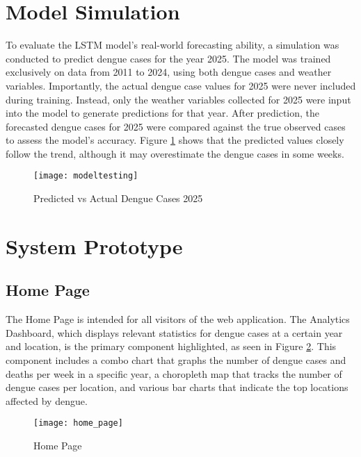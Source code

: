 \section{Model Simulation}
To evaluate the LSTM model's real-world forecasting ability, a simulation was conducted to predict dengue cases for the year 2025. The model was trained exclusively on data from 2011 to 2024, using both dengue cases and weather variables. Importantly, the actual dengue case values for 2025 were never included during training. Instead, only the weather variables collected for 2025 were input into the model to generate predictions for that year. After prediction, the forecasted dengue cases for 2025 were compared against the true observed cases to assess the model’s accuracy. Figure \ref{fig:modeltesting} shows that the predicted values closely follow the trend, although it may overestimate the dengue cases in some weeks. 

\begin{figure}[H]
	\centering
	\texttt{[image: modeltesting]}
	\caption{Predicted vs Actual Dengue Cases 2025}
	\label{fig:modeltesting}
\end{figure}

\section{System Prototype}
\subsection{Home Page}
The Home Page is intended for all visitors of the web application. The Analytics Dashboard, which displays relevant statistics for dengue cases at a certain year and location, is the primary component highlighted, as seen in Figure \ref{fig:home_page}. This component includes a combo chart that graphs the number of dengue cases and deaths per week in a specific year, a choropleth map that tracks the number of dengue cases per location, and various bar charts that indicate the top locations affected by dengue. 
\begin{figure}[H]
	\centering
	\texttt{[image: home\_page]}
	\caption{Home Page}
	\label{fig:home_page}
\end{figure}

